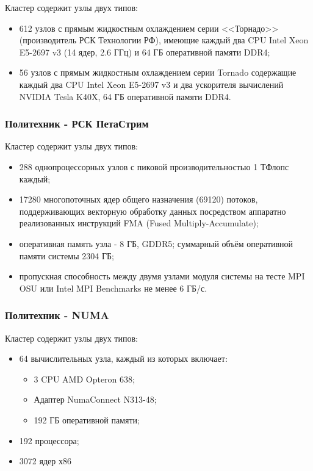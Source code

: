 \documentclass[a4paper, final]{article}
\begin{document}
Кластер содержит узлы двух типов:
\begin{itemize}
    \item 612 узлов с прямым жидкостным охлаждением серии <<Торнадо>>(производитель
    РСК Технологии РФ), имеющие каждый два CPU Intel Xeon E5-2697 v3 (14
    ядер, 2.6 ГГц) и 64 ГБ оперативной памяти DDR4;
    \item 56 узлов с прямым жидкостным охлаждением серии Tornado содержащие каждый
    два CPU Intel Xeon E5-2697 v3 и два ускорителя вычислений NVIDIA Tesla K40X,
    64 ГБ оперативной памяти DDR4.
\end{itemize}

\subsubsection*{Политехник - РСК ПетаСтрим}

Кластер содержит узлы двух типов:
\begin{itemize}
    \item 288 однопроцессорных узлов с пиковой производительностью 1 ТФлопс каждый;
    \item 17280 многопоточных ядер общего назначения (69120) потоков, поддерживающих
    векторную обработку данных посредством аппаратно реализованных инструкций FMA (Fused Multiply-Accumulate);
    \item оперативная память узла - 8 ГБ, GDDR5; суммарный объём оперативной памяти
    системы 2304 ГБ;
    \item пропускная способность между двумя узлами модуля системы на тесте MPI OSU
    или Intel MPI Benchmarks не менее 6 ГБ/с.
\end{itemize}

\subsubsection*{Политехник - NUMA}

Кластер содержит узлы двух типов:
\begin{itemize}
    \item 64 вычислительных узла, каждый из которых включает:
    \begin{itemize}
        \item 3 CPU AMD Opteron 638;
        \item Адаптер NumaConnect N313-48;
        \item 192 ГБ оперативной памяти;
    \end{itemize}
    \item 192 процессора;
    \item 3072 ядер х86
\end{itemize}
\end{document}
